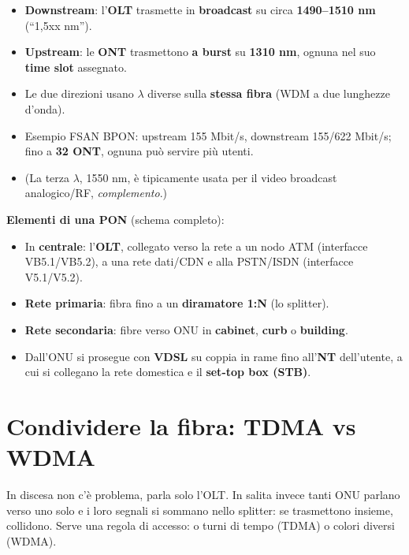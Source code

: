 \begin{itemize}
\tightlist
\item
  \textbf{Downstream}: l'\textbf{OLT} trasmette in \textbf{broadcast} su circa \textbf{1490--1510 nm} (``1,5xx nm'').
\item
  \textbf{Upstream}: le \textbf{ONT} trasmettono \textbf{a burst} su \textbf{1310 nm}, ognuna nel suo \textbf{time slot} assegnato.
\item
  Le due direzioni usano \(\lambda\) diverse sulla \textbf{stessa fibra} (WDM a due lunghezze d'onda).
\item
  Esempio FSAN BPON: upstream 155 Mbit/s, downstream 155/622 Mbit/s; fino a \textbf{32 ONT}, ognuna può servire più utenti.
\item
  (La terza \(\lambda\), 1550 nm, è tipicamente usata per il video broadcast analogico/RF, \emph{complemento}.)
\end{itemize}

\textbf{Elementi di una PON} (schema completo):

\begin{itemize}
\tightlist
\item
  In \textbf{centrale}: l'\textbf{OLT}, collegato verso la rete a un nodo ATM (interfacce VB5.1/VB5.2), a una rete dati/CDN e alla PSTN/ISDN (interfacce V5.1/V5.2).
\item
  \textbf{Rete primaria}: fibra fino a un \textbf{diramatore 1:N} (lo splitter).
\item
  \textbf{Rete secondaria}: fibre verso ONU in \textbf{cabinet}, \textbf{curb} o \textbf{building}.
\item
  Dall'ONU si prosegue con \textbf{VDSL} su coppia in rame fino all'\textbf{NT} dell'utente, a cui si collegano la rete domestica e il \textbf{set-top box (STB)}.
\end{itemize}

\section{Condividere la fibra: TDMA vs WDMA}

\begin{inbreve}

In discesa non c'è problema, parla solo l'OLT. In salita invece tanti ONU parlano verso uno solo e i loro segnali si sommano nello splitter: se trasmettono insieme, collidono. Serve una regola di accesso: o turni di tempo (TDMA) o colori diversi (WDMA).

\end{inbreve}

